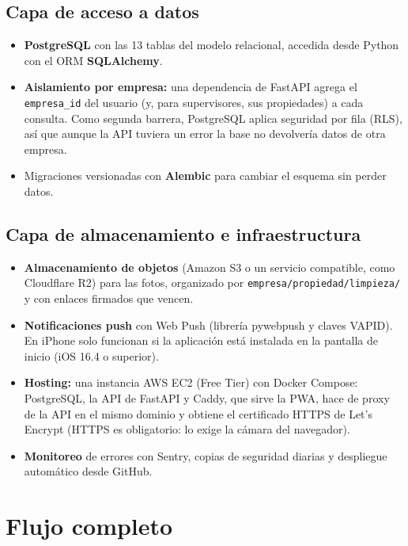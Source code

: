 \documentclass[11pt,a4paper]{article}
\begin{document}
\subsection{Capa de acceso a datos}
\begin{itemize}[leftmargin=1.2em]
  \item \textbf{PostgreSQL} con las 13 tablas del modelo relacional, accedida desde Python con el ORM \textbf{SQLAlchemy}.
  \item \textbf{Aislamiento por empresa:} una dependencia de FastAPI agrega el \texttt{empresa\_id} del usuario (y, para supervisores, sus propiedades) a cada consulta. Como segunda barrera, PostgreSQL aplica seguridad por fila (RLS), así que aunque la API tuviera un error la base no devolvería datos de otra empresa.
  \item Migraciones versionadas con \textbf{Alembic} para cambiar el esquema sin perder datos.
\end{itemize}

\subsection{Capa de almacenamiento e infraestructura}
\begin{itemize}[leftmargin=1.2em]
  \item \textbf{Almacenamiento de objetos} (Amazon S3 o un servicio compatible, como Cloudflare R2) para las fotos, organizado por \texttt{empresa/propiedad/limpieza/} y con enlaces firmados que vencen.
  \item \textbf{Notificaciones push} con Web Push (librería pywebpush y claves VAPID). En iPhone solo funcionan si la aplicación está instalada en la pantalla de inicio (iOS 16.4 o superior).
  \item \textbf{Hosting:} una instancia AWS EC2 (Free Tier) con Docker Compose: PostgreSQL, la API de FastAPI y Caddy, que sirve la PWA, hace de proxy de la API en el mismo dominio y obtiene el certificado HTTPS de Let's Encrypt (HTTPS es obligatorio: lo exige la cámara del navegador).
  \item \textbf{Monitoreo} de errores con Sentry, copias de seguridad diarias y despliegue automático desde GitHub.
\end{itemize}

\section{Flujo completo}
\end{document}
